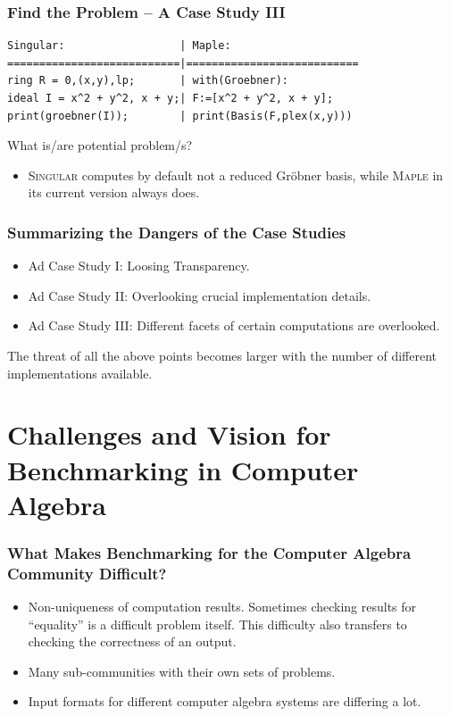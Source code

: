 \documentclass{beamer}
\begin{document}
\begin{frame}[fragile]
\frametitle{Find the Problem -- A Case Study III}
{\footnotesize{\begin{verbatim}
Singular:                  | Maple:
===========================|===========================
ring R = 0,(x,y),lp;       | with(Groebner):
ideal I = x^2 + y^2, x + y;| F:=[x^2 + y^2, x + y];
print(groebner(I));        | print(Basis(F,plex(x,y)))
\end{verbatim}}}
What is/are potential problem/s?
\pause
\begin{itemize}
\item \textsc{Singular} computes by default not a \alert{reduced} Gr\"obner
  basis, while \textsc{Maple} in its current version always does.
\end{itemize}
\end{frame}

\frame
{
  \frametitle{Summarizing the Dangers of the Case Studies}
  \begin{itemize}
  \item Ad Case Study I: Loosing Transparency.
  \item Ad Case Study II: Overlooking crucial implementation details.
  \item Ad Case Study III: Different facets of certain computations
    are overlooked.
  \end{itemize}

  The threat of all the above points becomes larger with the number of
  different implementations available.
}

\section{Challenges  and Vision for Benchmarking in Computer Algebra}
\frame
{
    \begin{center}
      {\Huge{\insertsection}}
    \end{center}
}

\begin{frame}
\frametitle{What Makes Benchmarking for the Computer Algebra Community
Difficult?}
\begin{itemize}
\item Non-uniqueness of computation results. Sometimes checking
  results for ``equality'' is a difficult problem itself. This
  difficulty also transfers to checking the correctness of an output.
\item Many sub-communities with their own sets of problems.
\item Input formats for different computer algebra systems are
  differing a lot.
\end{itemize}
\end{frame}
\end{document}
